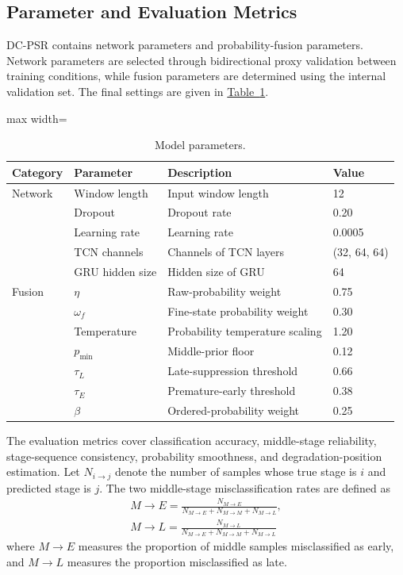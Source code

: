 \documentclass[a4paper,fleqn]{cas-sc}
\providecommand{\tabref}{}
\renewcommand{\tabref}[1]{\hyperref[#1]{Table~\ref*{#1}}}
\begin{document}
  \subsection{Parameter and Evaluation Metrics}
\label{sec:metrics}
  DC-PSR contains network parameters and probability-fusion parameters. Network parameters are selected through bidirectional proxy validation between training conditions, while fusion parameters are determined using the internal validation set. The final settings are given in \tabref{tab:6}.

  \begin{table}[!htbp]
    \centering
    \scriptsize
  \caption{Model parameters.}
    \label{tab:6}
    \begin{adjustbox}{max width=\textwidth}
      \begin{tabular}{llll}
        \toprule
        \textbf{Category} & \textbf{Parameter} & \textbf{Description} & \textbf{Value} \\
        \midrule
        Network & Window length & Input window length & 12 \\
        & Dropout & Dropout rate & 0.20 \\
        & Learning rate & Learning rate & 0.0005 \\
        & TCN channels & Channels of TCN layers & (32, 64, 64) \\
        & GRU hidden size & Hidden size of GRU & 64 \\
        Fusion & $\eta$ & Raw-probability weight & 0.75 \\
        & $\omega_{f}$ & Fine-state probability weight & 0.30 \\
        & Temperature & Probability temperature scaling & 1.20 \\
        & $p_{\min}$ & Middle-prior floor & 0.12 \\
        & $\tau_{L}$ & Late-suppression threshold & 0.66 \\
        & $\tau_{E}$ & Premature-early threshold & 0.38 \\
        & $\beta$ & Ordered-probability weight & 0.25 \\
        \bottomrule
      \end{tabular}
    \end{adjustbox}
  \end{table}
  The evaluation metrics cover classification accuracy, middle-stage reliability, stage-sequence consistency, probability smoothness, and degradation-position estimation. Let $N_{i\to j}$ denote the number of samples whose true stage is $i$ and predicted stage is $j$. The two middle-stage misclassification rates are defined as
  \begin{equation}
    \begin{aligned}
      M\rightarrow E=\frac{N_{M\rightarrow E}}{N_{M\rightarrow E}+N_{M\to M}+N_{M\rightarrow L}},\\
      M\rightarrow L=\frac{N_{M\rightarrow L}}{N_{M\rightarrow E}+N_{M\to M}+N_{M\rightarrow L}}
    \end{aligned}
  \end{equation}
  where $M\rightarrow E$ measures the proportion of middle samples misclassified as early, and $M\rightarrow L$ measures the proportion misclassified as late.
\end{document}
